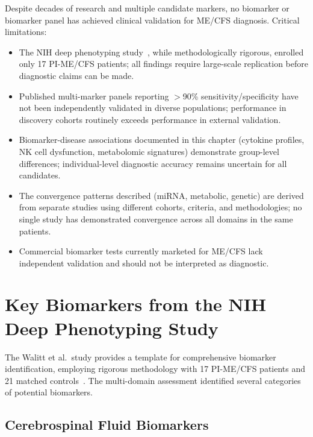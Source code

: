 \begin{limitation}
Despite decades of research and multiple candidate markers, no biomarker or biomarker panel has achieved clinical validation for ME/CFS diagnosis. Critical limitations:
\begin{itemize}
    \item The NIH deep phenotyping study~\cite{walitt2024deep}, while methodologically rigorous, enrolled only 17 PI-ME/CFS patients; all findings require large-scale replication before diagnostic claims can be made.
    \item Published multi-marker panels reporting $>$90\% sensitivity/specificity have not been independently validated in diverse populations; performance in discovery cohorts routinely exceeds performance in external validation.
    \item Biomarker-disease associations documented in this chapter (cytokine profiles, NK cell dysfunction, metabolomic signatures) demonstrate group-level differences; individual-level diagnostic accuracy remains uncertain for all candidates.
    \item The convergence patterns described (miRNA, metabolic, genetic) are derived from separate studies using different cohorts, criteria, and methodologies; no single study has demonstrated convergence across all domains in the same patients.
    \item Commercial biomarker tests currently marketed for ME/CFS lack independent validation and should not be interpreted as diagnostic.
\end{itemize}
\end{limitation}

\section{Key Biomarkers from the NIH Deep Phenotyping Study}
\label{sec:nih-biomarkers}

The Walitt et al.\ study provides a template for comprehensive biomarker identification, employing rigorous methodology with 17 PI-ME/CFS patients and 21 matched controls~\cite{walitt2024deep}. The multi-domain assessment identified several categories of potential biomarkers.

\subsection{Cerebrospinal Fluid Biomarkers}

